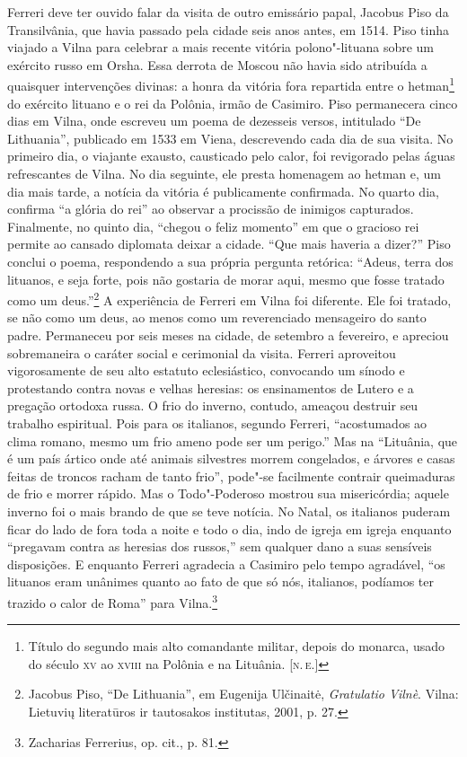Ferreri deve ter ouvido falar da visita de outro emissário papal,
Jacobus Piso da Transilvânia, que havia passado pela cidade seis anos
antes, em 1514. Piso tinha viajado a Vilna para celebrar a mais recente
vitória polono"-lituana sobre um exército russo em Orsha. Essa derrota de
Moscou não havia sido atribuída a quaisquer intervenções divinas: a
honra da vitória fora repartida entre o hetman\footnote{Título do segundo mais alto comandante militar, depois do monarca, usado do século \textsc{xv} ao \textsc{xviii} na Polônia e na Lituânia. [\textsc{n.\,e.}]} do exército lituano e o
rei da Polônia, irmão de Casimiro. Piso permanecera cinco dias em Vilna,
onde escreveu um poema de dezesseis versos, intitulado ``De Lithuania'',
publicado em 1533 em Viena, descrevendo cada dia de sua visita. No
primeiro dia, o viajante exausto, causticado pelo calor, foi revigorado
pelas águas refrescantes de Vilna. No dia seguinte, ele presta homenagem
ao hetman e, um dia mais tarde, a notícia da vitória é publicamente
confirmada. No quarto dia, confirma ``a glória do rei'' ao observar a
procissão de inimigos capturados. Finalmente, no quinto dia, ``chegou o
feliz momento'' em que o gracioso rei permite ao cansado diplomata
deixar a cidade. ``Que mais haveria a dizer?'' Piso conclui o poema,
respondendo a sua própria pergunta retórica: ``Adeus, terra dos
lituanos, e seja forte, pois não gostaria de morar aqui, mesmo que fosse
tratado como um deus.''\footnote{Jacobus Piso, ``De Lithuania'', em Eugenija Ulčinaitė, \textit{Gratulatio Vilnè}. Vilna: Lietuvių literatūros ir tautosakos institutas, 2001, p. 27.}
A experiência de Ferreri em Vilna foi diferente. Ele foi tratado, se não
como um deus, ao menos como um reverenciado mensageiro do santo padre.
Permaneceu por seis meses na cidade, de setembro a fevereiro, e apreciou
sobremaneira o caráter social e cerimonial da visita. Ferreri aproveitou
vigorosamente de seu alto estatuto eclesiástico, convocando um sínodo e
protestando contra novas e velhas heresias: os ensinamentos de Lutero e
a pregação ortodoxa russa. O frio do inverno, contudo, ameaçou destruir
seu trabalho espiritual. Pois para os italianos, segundo Ferreri,
``acostumados ao clima romano, mesmo um frio ameno pode ser um perigo.''
Mas na ``Lituânia, que é um país ártico onde até animais silvestres
morrem congelados, e árvores e casas feitas de troncos racham de tanto
frio'', pode"-se facilmente contrair queimaduras de frio e morrer rápido.
Mas o Todo"-Poderoso mostrou sua misericórdia; aquele inverno foi o mais
brando de que se teve notícia. No Natal, os italianos puderam ficar do
lado de fora toda a noite e todo o dia, indo de igreja em igreja
enquanto ``pregavam contra as heresias dos russos,'' sem qualquer dano a
suas sensíveis disposições. E enquanto Ferreri agradecia a Casimiro pelo
tempo agradável, ``os lituanos eram unânimes quanto ao fato de que só
nós, italianos, podíamos ter trazido o calor de Roma'' para
Vilna.\footnote{Zacharias Ferrerius, op. cit., p. 81.}

